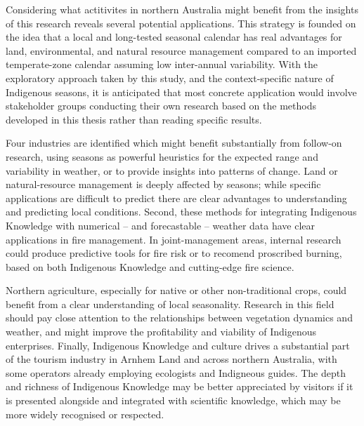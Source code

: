 Considering what actitivites in northern Australia might benefit from the
insights of this research reveals several potential applications.  This strategy is
founded on the idea that a local and long-tested seasonal calendar has real
advantages for land, environmental, and natural resource management compared
to an imported temperate-zone calendar assuming low inter-annual variability.
%
With the exploratory approach taken by this study, and the context-specific
nature of Indigenous seasons, it is anticipated that most concrete application
would involve stakeholder groups conducting their own research based on the
methods developed in this thesis rather than reading specific results.


Four industries are identified which might benefit substantially from follow-on
research, using seasons as powerful heuristics for the expected range
and variability in weather, or to provide insights into patterns of change.
%
Land or natural-resource management is deeply affected by seasons; while
specific applications are difficult to predict there are clear advantages
to understanding and predicting local conditions.
%
Second, these methods for integrating Indigenous Knowledge with numerical --
and forecastable -- weather data have clear applications in fire management.
In joint-management areas, internal research could produce predictive tools
for fire risk or to recomend proscribed burning, based on both Indigenous
Knowledge and cutting-edge fire science.

Northern agriculture, especially for native or other non-traditional crops,
could benefit from a clear understanding of local seasonality.  Research in
this field should pay close attention to the relationships between vegetation
dynamics and weather, and might improve the profitability and viability of Indigenous
enterprises.
%
Finally, Indigenous Knowledge and culture drives a substantial part of the
tourism industry in Arnhem Land and across northern Australia, with some
operators already employing ecologists and Indigneous guides.  The depth and
richness of Indigenous Knowledge may be better appreciated by visitors if
it is presented alongside and integrated with scientific knowledge, which
may be more widely recognised or respected.


